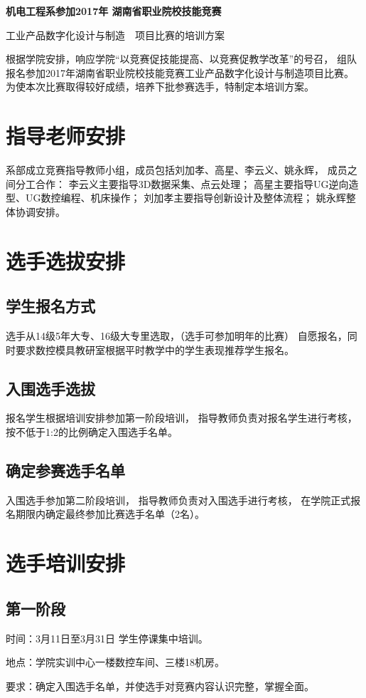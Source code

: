 \documentclass[a4paper,zihao=-4,linespread=1.35]{ctexart}
\begin{document}
\begin{center}
\songti \bf {}机电工程系参加2017年 湖南省职业院校技能竞赛 \par
工业产品数字化设计与制造\ \ 项目比赛的培训方案
\end{center} \par
根据学院安排，响应学院“以竞赛促技能提高、以竞赛促教学改革”的号召，
组队报名参加2017年湖南省职业院校技能竞赛工业产品数字化设计与制造项目比赛。
为使本次比赛取得较好成绩，培养下批参赛选手，特制定本培训方案。

\section{指导老师安排}
系部成立竞赛指导教师小组，成员包括刘加孝、高星、李云义、姚永辉，
成员之间分工合作：
李云义主要指导3D数据采集、点云处理；
高星主要指导UG逆向造型、UG数控编程、机床操作；
刘加孝主要指导创新设计及整体流程；
姚永辉整体协调安排。

\section{选手选拔安排}

\subsection{学生报名方式}
选手从14级5年大专、16级大专里选取，（选手可参加明年的比赛）
自愿报名，同时要求数控模具教研室根据平时教学中的学生表现推荐学生报名。

\subsection{入围选手选拔}

报名学生根据培训安排参加第一阶段培训，
指导教师负责对报名学生进行考核，
按不低于1:2的比例确定入围选手名单。

\subsection{确定参赛选手名单}
入围选手参加第二阶段培训，
指导教师负责对入围选手进行考核，
在学院正式报名期限内确定最终参加比赛选手名单（2名）。  

\section{选手培训安排}
\subsection{第一阶段}
时间：3月11日至3月31日 学生停课集中培训。\par
地点：学院实训中心一楼数控车间、三楼18机房。\par
要求：确定入围选手名单，并使选手对竞赛内容认识完整，掌握全面。\par
\end{document}
